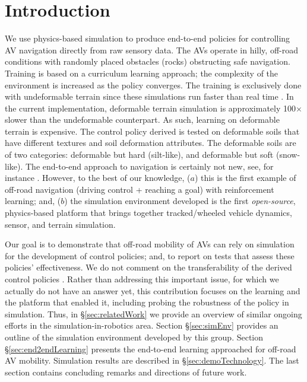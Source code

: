 


\section{Introduction}

We use physics-based simulation to produce end-to-end policies for controlling AV navigation directly from raw sensory data. The AVs operate in hilly, off-road conditions with randomly placed obstacles (rocks) obstructing safe navigation. Training is based on a curriculum learning approach; the complexity of the environment is increased as the policy converges. The training is exclusively done with undeformable terrain since these simulations run faster than real time \cite{negrutGVSETS2020}. In the current implementation, deformable terrain simulation is approximately 100$ \times $ slower than the undeformable counterpart. As such, learning on deformable terrain is expensive. The control policy derived is tested on deformable soils that have different textures and soil deformation attributes. The deformable soils are of two categories: deformable but hard (silt-like), and deformable but soft (snow-like). The end-to-end approach to navigation is certainly not new, see, for instance \cite{end2endNVIDIA2016,AminiRKR19}. However, to the best of our knowledge, ($a$) this is the first example of off-road navigation (driving control + reaching a goal) with reinforcement learning; and, ($b$) the simulation environment developed is the first \textit{open-source}, physics-based platform that brings together tracked/wheeled vehicle dynamics, sensor, and terrain simulation. %

Our goal is to demonstrate that off-road mobility of AVs can rely on simulation for the development of control policies; and, to report on tests that assess these policies' effectiveness. We do not comment on the transferability of the derived control policies \cite{sim2realGapEssex1995}. Rather than addressing this important issue, for which we actually do not have an answer yet, this contribution focuses on the learning and the platform that enabled it, including probing the robustness of the policy in simulation. Thus, in \S\ref{sec:relatedWork} we provide an overview of similar ongoing efforts in the simulation-in-robotics area. Section \S\ref{sec:simEnv} provides an outline of the simulation environment developed by this group. Section \S\ref{sec:end2endLearning} presents the end-to-end learning approached for off-road AV mobility. Simulation results are described in \S\ref{sec:demoTechnology}. The last section contains concluding remarks and directions of future work.

